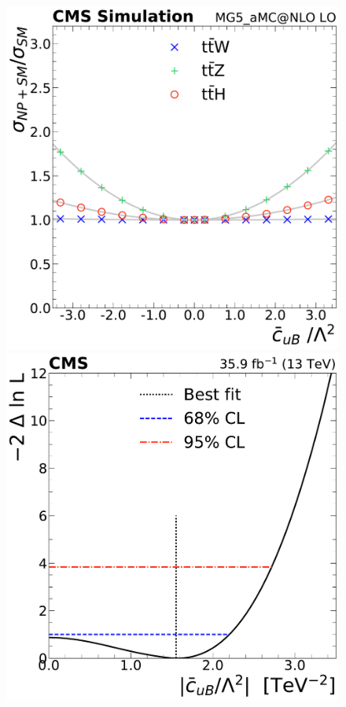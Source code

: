 \begin{landscape}
\begin{figure}
{        \includegraphics[height=\textheight]{figures/thirteen-TeV/NP/mu/cuB}\hspace{1cm}
        \includegraphics[height=\textheight]{figures/thirteen-TeV/NP/nll/cuB}\hspace{1cm}
}
\end{figure}
\end{landscape}
